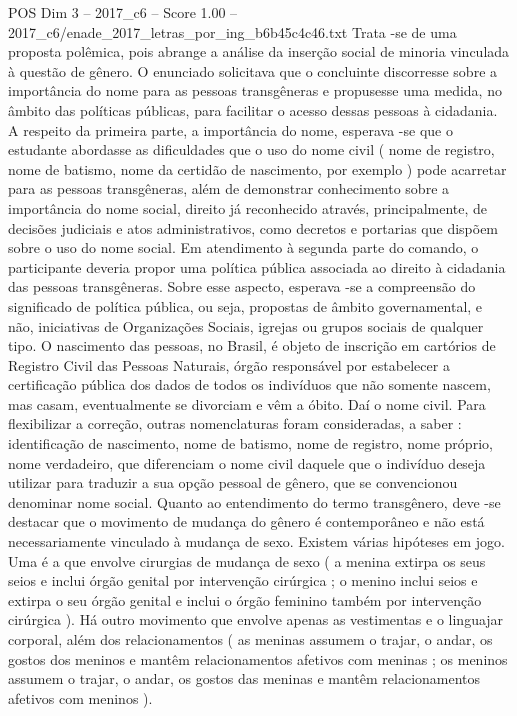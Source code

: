 \begin{textsample}{POS Dim 3 – 2017\_c6 – Score 1.00 – 2017\_c6/enade\_2017\_letras\_por\_ing\_b6b45c4c46.txt}
Trata -se de uma proposta polêmica, pois abrange a análise da inserção social de minoria vinculada à questão de gênero.
O enunciado solicitava que o concluinte discorresse sobre a importância do nome para as pessoas transgêneras e propusesse uma medida, no âmbito das políticas públicas, para facilitar o acesso dessas pessoas à cidadania.
A respeito da primeira parte, a importância do nome, esperava -se que o estudante abordasse as dificuldades que o uso do nome civil ( nome de registro, nome de batismo, nome da certidão de nascimento, por exemplo ) pode acarretar para as pessoas transgêneras, além de demonstrar conhecimento sobre a importância do nome social, direito já reconhecido através, principalmente, de decisões judiciais e atos administrativos, como decretos e portarias que dispõem sobre o uso do nome social.
Em atendimento à segunda parte do comando, o participante deveria propor uma política pública associada ao direito à cidadania das pessoas transgêneras.
Sobre esse aspecto, esperava -se a compreensão do significado de política pública, ou seja, propostas de âmbito governamental, e não, iniciativas de Organizações Sociais, igrejas ou grupos sociais de qualquer tipo.
O nascimento das pessoas, no Brasil, é objeto de inscrição em cartórios de Registro Civil das Pessoas Naturais, órgão responsável por estabelecer a certificação pública dos dados de todos os indivíduos que não somente nascem, mas casam, eventualmente se divorciam e vêm a óbito.
Daí o nome civil.
Para flexibilizar a correção, outras nomenclaturas foram consideradas, a saber : identificação de nascimento, nome de batismo, nome de registro, nome próprio, nome verdadeiro, que diferenciam o nome civil daquele que o indivíduo deseja utilizar para traduzir a sua opção pessoal de gênero, que se convencionou denominar nome social.
Quanto ao entendimento do termo transgênero, deve -se destacar que o movimento de mudança do gênero é contemporâneo e não está necessariamente vinculado à mudança de sexo.
Existem várias hipóteses em jogo.
Uma é a que envolve cirurgias de mudança de sexo ( a menina extirpa os seus seios e inclui órgão genital por intervenção cirúrgica ; o menino inclui seios e extirpa o seu órgão genital e inclui o órgão feminino também por intervenção cirúrgica ).
Há outro movimento que envolve apenas as vestimentas e o linguajar corporal, além dos relacionamentos ( as meninas assumem o trajar, o andar, os gostos dos meninos e mantêm relacionamentos afetivos com meninas ; os meninos assumem o trajar, o andar, os gostos das meninas e mantêm relacionamentos afetivos com meninos ).

\end{textsample}
